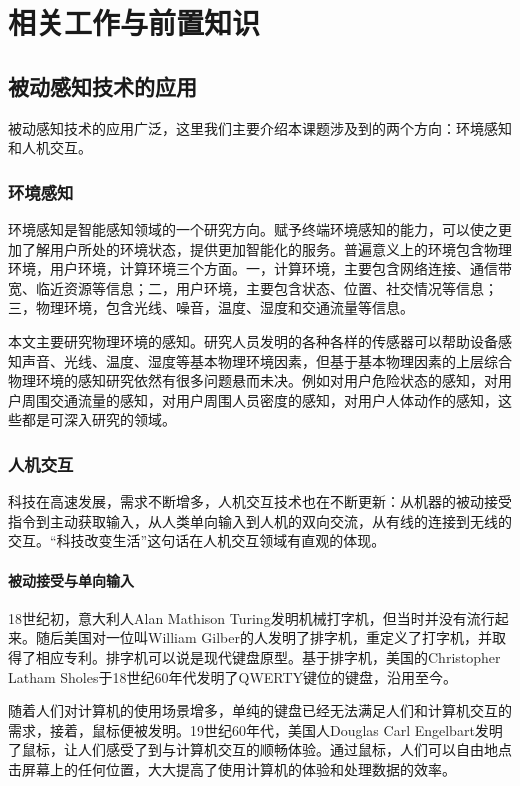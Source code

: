 \chapter{相关工作与前置知识}

\section{被动感知技术的应用}
被动感知技术的应用广泛，这里我们主要介绍本课题涉及到的两个方向：环境感知和人机交互。
\subsection{环境感知}
环境感知是智能感知领域的一个研究方向。赋予终端环境感知的能力，可以使之更加了解用户所处的环境状态，提供更加智能化的服务。普遍意义上的环境包含物理环境，用户环境，计算环境三个方面。一，计算环境，主要包含网络连接、通信带宽、临近资源等信息；二，用户环境，主要包含状态、位置、社交情况等信息；三，物理环境，包含光线、噪音，温度、湿度和交通流量等信息。

本文主要研究物理环境的感知。研究人员发明的各种各样的传感器可以帮助设备感知声音、光线、温度、湿度等基本物理环境因素，但基于基本物理因素的上层综合物理环境的感知研究依然有很多问题悬而未决。例如对用户危险状态的感知，对用户周围交通流量的感知，对用户周围人员密度的感知，对用户人体动作的感知，这些都是可深入研究的领域。

\subsection{人机交互}

科技在高速发展，需求不断增多，人机交互技术也在不断更新：从机器的被动接受指令到主动获取输入，从人类单向输入到人机的双向交流，从有线的连接到无线的交互。“科技改变生活”这句话在人机交互领域有直观的体现。

\subsubsection{被动接受与单向输入}

18世纪初，意大利人Alan Mathison Turing发明机械打字机，但当时并没有流行起来。随后美国对一位叫William Gilber的人发明了排字机，重定义了打字机，并取得了相应专利。排字机可以说是现代键盘原型。基于排字机，美国的Christopher Latham Sholes于18世纪60年代发明了QWERTY键位的键盘，沿用至今。

随着人们对计算机的使用场景增多，单纯的键盘已经无法满足人们和计算机交互的需求，接着，鼠标便被发明。19世纪60年代，美国人Douglas Carl Engelbart发明了鼠标，让人们感受了到与计算机交互的顺畅体验。通过鼠标，人们可以自由地点击屏幕上的任何位置，大大提高了使用计算机的体验和处理数据的效率。


